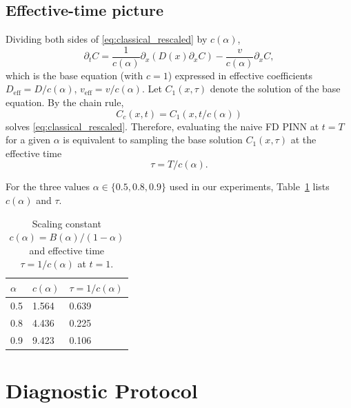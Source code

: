 \documentclass[11pt]{article}
\begin{document}
\subsection{Effective-time picture}

Dividing both sides of \eqref{eq:classical_rescaled} by \(c(\alpha)\),
\begin{equation}
\partial_t C = \frac{1}{c(\alpha)}\partial_x(D(x)\partial_x C) - \frac{v}{c(\alpha)}\partial_x C,
\end{equation}
which is the base equation (with \(c=1\)) expressed in effective coefficients \(D_{\mathrm{eff}} = D/c(\alpha)\), \(v_{\mathrm{eff}} = v/c(\alpha)\). Let \(C_1(x,\tau)\) denote the solution of the base equation. By the chain rule,
\begin{equation}
C_c(x,t) = C_1\!\left(x, t/c(\alpha)\right)
\label{eq:eff_time}
\end{equation}
solves \eqref{eq:classical_rescaled}. Therefore, evaluating the naive FD PINN at \(t=T\) for a given \(\alpha\) is equivalent to sampling the base solution \(C_1(x,\tau)\) at the effective time
\begin{equation}
\tau = T/c(\alpha).
\label{eq:tau}
\end{equation}

For the three values \(\alpha \in \{0.5, 0.8, 0.9\}\) used in our experiments, Table~\ref{tab:tau} lists \(c(\alpha)\) and \(\tau\).

\begin{table}[h]
\centering
\caption{Scaling constant \(c(\alpha) = B(\alpha)/(1-\alpha)\) and effective time \(\tau = 1/c(\alpha)\) at \(t=1\).}
\label{tab:tau}
\begin{tabular}{lll}
\toprule
\(\alpha\) & \(c(\alpha)\) & \(\tau = 1/c(\alpha)\) \\
\midrule
0.5 & 1.564 & 0.639 \\
0.8 & 4.436 & 0.225 \\
0.9 & 9.423 & 0.106 \\
\bottomrule
\end{tabular}
\end{table}

\section{Diagnostic Protocol}
\label{sec:protocol}
\end{document}
